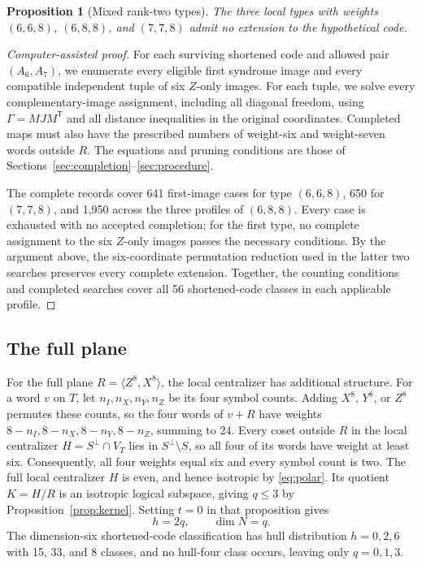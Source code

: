 \documentclass[11pt]{article}
\newtheorem{proposition}[theorem]{Proposition}
\theoremstyle{definition}
\theoremstyle{remark}
\newcommand{\tr}{\mathsf T}
\begin{document}
\begin{proposition}[Mixed rank-two types]\label{prop:17-mixed}
The three local types with weights \((6,6,8)\), \((6,8,8)\), and
\((7,7,8)\) admit no extension to the hypothetical code.
\end{proposition}
\begin{proof}[Computer-assisted proof]
For each surviving shortened code and allowed pair \((A_6,A_7)\), we
enumerate every eligible first syndrome image and every compatible
independent tuple of six \(Z\)-only images. For each tuple, we solve
every complementary-image assignment, including all diagonal freedom,
using \(\Gamma=MJM^\tr\) and all distance inequalities in the original
coordinates. Completed maps must also have the prescribed numbers of
weight-six and weight-seven words outside \(R\). The equations and
pruning conditions are those of
Sections~\ref{sec:completion}--\ref{sec:procedure}.

The complete records cover 641 first-image cases for type \((6,6,8)\),
650 for \((7,7,8)\), and 1,950 across the three profiles of \((6,8,8)\).
Every case is exhausted with no accepted completion; for the first type,
no complete assignment to the six \(Z\)-only images passes the necessary
conditions. By the argument above, the six-coordinate permutation
reduction used in the latter two searches preserves every complete
extension. Together, the counting conditions and completed searches
cover all 56 shortened-code classes in each applicable profile.
\end{proof}

\subsection{The full plane}

For the full plane \(R=\langle Z^8,X^8\rangle\), the local centralizer
has additional structure. For a word \(v\) on \(T\), let
\(n_I,n_X,n_Y,n_Z\) be its four symbol counts. Adding \(X^8\), \(Y^8\),
or \(Z^8\) permutes these counts, so the four words of \(v+R\) have
weights \(8-n_I,8-n_X,8-n_Y,8-n_Z\), summing to 24. Every coset outside
\(R\) in the local centralizer \(H=S^\perp\cap V_T\) lies in
\(S^\perp\setminus S\), so all four of its words have weight at least
six. Consequently, all four weights equal six and every symbol count is
two. The full local centralizer \(H\) is even, and hence
isotropic by \eqref{eq:polar}. Its quotient \(K=H/R\) is an isotropic
logical subspace, giving \(q\leq3\) by Proposition~\ref{prop:kernel}.
Setting \(t=0\) in that proposition gives
\[
 h=2q,\qquad \dim N=q.
\]
The dimension-six shortened-code classification has hull distribution
\(h=0,2,6\) with 15, 33, and 8 classes, and no hull-four class occurs,
leaving only \(q=0,1,3\).
\end{document}
